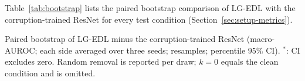 Table~\ref{tab:bootstrap} lists the paired bootstrap comparison of LG-EDL with the corruption-trained ResNet for every
test condition (Section~\ref{sec:setup-metrics}).

\begin{table}[h]
\centering
\caption{Paired bootstrap of LG-EDL minus the corruption-trained ResNet (macro-AUROC; each side averaged over three
seeds; \bootNBoot{} resamples; percentile 95\% CI). $^{*}$: CI excludes zero. Random removal is reported per draw;
$k=0$ equals the clean condition and is omitted.}
\label{tab:bootstrap}
\begin{adjustbox}{max width=\columnwidth}\end{adjustbox}
\end{table}
